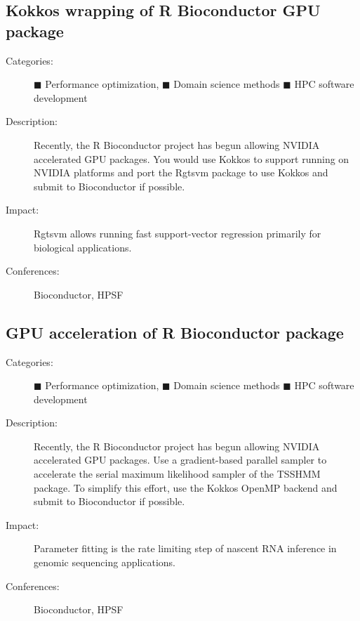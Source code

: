 \documentclass[12pt]{article}
\begin{document}
\subsection{Kokkos wrapping of R Bioconductor GPU package}
\begin{description}
\item[Categories:]
  \textcolor{orange!90!black}{$\blacksquare$} Performance optimization,
  \textcolor{green!50!black}{$\blacksquare$} Domain science methods
  \textcolor{blue!80!black}{$\blacksquare$} HPC software development
\item[Description:] Recently, %
  the R Bioconductor project has begun allowing NVIDIA accelerated %
  GPU packages.
  You would use Kokkos to support running on NVIDIA platforms %
  and port the Rgtsvm package to use Kokkos %
  and submit to Bioconductor if possible.
\item[Impact:] Rgtsvm allows running fast support-vector regression %
  primarily for biological applications.
\item[Conferences:] Bioconductor, HPSF
\end{description}

\subsection{GPU acceleration of R Bioconductor package}
\begin{description}
\item[Categories:]
  \textcolor{orange!90!black}{$\blacksquare$} Performance optimization,
  \textcolor{green!50!black}{$\blacksquare$} Domain science methods
  \textcolor{blue!80!black}{$\blacksquare$} HPC software development
\item[Description:] Recently, %
  the R Bioconductor project has begun allowing NVIDIA accelerated %
  GPU packages.
  Use a gradient-based parallel sampler %
  to accelerate the serial maximum likelihood sampler %
  of the TSSHMM package.
  To simplify this effort, %
  use the Kokkos OpenMP backend %
  and submit to Bioconductor if possible.
\item[Impact:] Parameter fitting is the rate limiting step %
  of nascent RNA inference %
  in genomic sequencing applications.
\item[Conferences:] Bioconductor, HPSF
\end{description}
\end{document}
